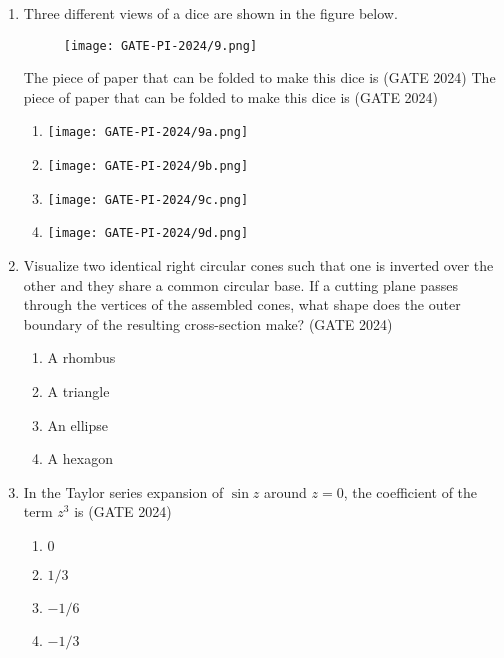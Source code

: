 \documentclass[journal,12pt,onecolumn]{IEEEtran}
\theoremstyle{remark}
\begin{document}
\begin{enumerate}
\item Three different views of a dice are shown in the figure below.

\begin{figure}[H]
    \centering
    \texttt{[image: GATE-PI-2024/9.png]} 
    \label{9}
\end{figure}

The piece of paper that can be folded to make this dice is
\hfill{(GATE 2024)}
The piece of paper that can be folded to make this dice is
\hfill{(GATE 2024)}

\begin{enumerate}
    \item \texttt{[image: GATE-PI-2024/9a.png]} 
    \item \texttt{[image: GATE-PI-2024/9b.png]}
    \item \texttt{[image: GATE-PI-2024/9c.png]} 
    \item \texttt{[image: GATE-PI-2024/9d.png]} 
\end{enumerate}

\vspace{1cm}




\vspace{1cm}

\item Visualize two identical right circular cones such that one is inverted over the other and they share a common circular base. If a cutting plane passes through the vertices of the assembled cones, what shape does the outer boundary of the resulting cross-section make?
\hfill{(GATE 2024)}
\begin{multicols}{4}
\begin{enumerate}
    \item A rhombus
    \item A triangle
    \item An ellipse
    \item A hexagon
\end{enumerate}
\end{multicols}
\vspace{1cm}

\item In the Taylor series expansion of $\sin z$ around $z = 0$, the coefficient of the term $z^3$ is
\hfill{(GATE 2024)}
\begin{multicols}{4}
\begin{enumerate}
    \item $0$
    \item $1/3$
    \item $-1/6$
    \item $-1/3$
\end{enumerate}
\end{multicols}
\vspace{1cm}


\end{enumerate}
\end{document}
